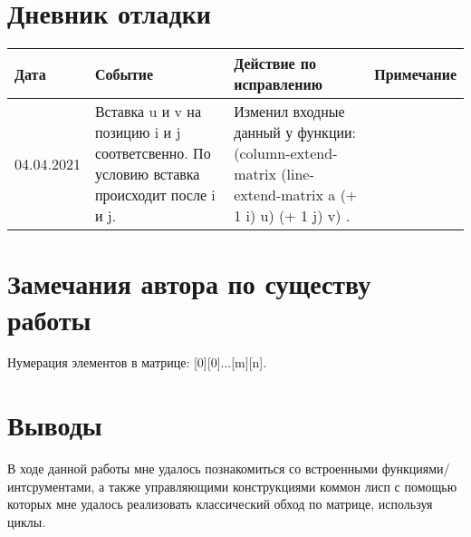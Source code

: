 \documentclass[12pt]{article}
\begin{document}
\section{Дневник отладки}
\begin{tabular}{|p{50pt}|p{130pt}|p{130pt}|p{70pt}|}
\hline
Дата & Событие & Действие по исправлению & Примечание \\ \hline
04.04.2021 & Вставка u и v на позицию i и j соответсвенно. По условию вставка происходит после i и j.  & Изменил входные данный у функции: (column-extend-matrix (line-extend-matrix a (+ 1 i) u) (+ 1 j) v) .  &\\
\hline
\end{tabular}

\section{Замечания автора по существу работы}
Нумерация элементов в матрице: [0][0]...[m][n].

\section{Выводы}
В ходе данной работы мне удалось познакомиться со встроенными функциями/интсрументами, а также управляющими конструкциями коммон лисп с помощью которых мне удалось реализовать классический обход по матрице, используя циклы. 
\end{document}
